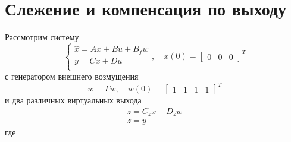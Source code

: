 \section{Слежение и компенсация по выходу}
Рассмотрим систему 
\begin{equation}
    \begin{cases}
        \hat{x} = Ax + Bu + B_f w \\ 
        y = Cx + Du \\ 
    \end{cases}, \quad x(0) = \begin{bmatrix}0 & 0 & 0\end{bmatrix}^T
\end{equation}
с генератором внешнего возмущения 
\begin{equation}
    \dot{w} = \Gamma w, \quad w(0) = \begin{bmatrix}1 & 1 & 1 & 1\end{bmatrix}^T
\end{equation}
и два различных виртуальных выхода
\begin{equation}
    \begin{array}{ll}
        z = C_z x + D_z w \\ 
        z = y
    \end{array}
\end{equation}
где 
